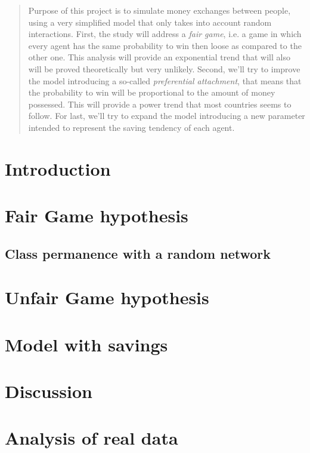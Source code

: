 \documentclass[12pt,a4paper]{article}
\title{}
\author{Simone Balducci, Gregorio Berselli}
\date{}
\begin{document}
\maketitle

\begin{abstract}
    Purpose of this project is to simulate money exchanges between people, using a very simplified model that only takes into account random interactions.
    First, the study will address a \emph{fair game}, i.e. a game in which every agent has the same probability to win then loose as compared to the other one.
    This analysis will provide an exponential trend that will also will be proved theoretically but very unlikely.
    Second, we'll try to improve the model introducing a so-called \emph{preferential attachment}, that means that the probability to win will be proportional to the amount of money possessed.
    This will provide a power trend that most countries seems to follow.
    For last, we'll try to expand the model introducing a new parameter intended to represent the saving tendency of each agent. 
\end{abstract}

\newpage
\thispagestyle{empty}
\addtocounter{page}{-2}
\mbox{}

\tableofcontents
\pagebreak

\section{Introduction}


\section{Fair Game hypothesis}


\subsection{Class permanence with a random network}


\section{Unfair Game hypothesis}


\section{Model with savings}


\section{Discussion}


\section{Analysis of real data}


\newpage
\thispagestyle{empty}
\mbox{}

\printbibliography
\end{document}
